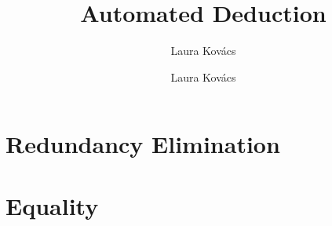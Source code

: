 \documentclass[10pt]{beamer}
\author{
  \textcolor{red!90!black}{Laura Kov\'acs}}
\title{
              	       Automated Deduction
}
\author{
  \textcolor{red!90!black}{Laura Kov\'acs} \\
\titlegraphic{\hspace*{1em}\texttt{[image: forsyte]}}}
\begin{document}
\date{}
\frame{\titlepage}

%

%


\section{Redundancy Elimination}



\section{Equality}

\end{document}
